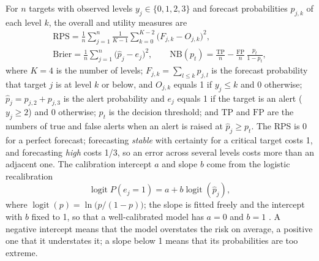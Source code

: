 For $n$ targets with observed levels $y_j \in \{0, 1, 2, 3\}$ and forecast probabilities $p_{j,k}$ of each level $k$, the overall and utility measures are
\begin{equation}
\begin{gathered}
  \mathrm{RPS} = \frac{1}{n}\sum_{j=1}^{n} \frac{1}{K-1}\sum_{k=0}^{K-2}\bigl(F_{j,k} - O_{j,k}\bigr)^2, \\
  \mathrm{Brier} = \frac{1}{n}\sum_{j=1}^{n}\bigl(\hat p_j - e_j\bigr)^2, \qquad
  \mathrm{NB}(p_t) = \frac{\mathrm{TP}}{n} - \frac{\mathrm{FP}}{n}\,\frac{p_t}{1-p_t},
\end{gathered}
\end{equation}
where $K = 4$ is the number of levels; $F_{j,k} = \sum_{l \leq k} p_{j,l}$ is the forecast probability that target $j$ is at level $k$ or below, and $O_{j,k}$ equals 1 if $y_j \leq k$ and 0 otherwise; $\hat p_j = p_{j,2} + p_{j,3}$ is the alert probability and $e_j$ equals 1 if the target is an alert ($y_j \geq 2$) and 0 otherwise; $p_t$ is the decision threshold; and $\mathrm{TP}$ and $\mathrm{FP}$ are the numbers of true and false alerts when an alert is raised at $\hat p_j \geq p_t$. The RPS is 0 for a perfect forecast; forecasting \emph{stable} with certainty for a critical target costs 1, and forecasting \emph{high} costs 1/3, so an error across several levels costs more than an adjacent one. The calibration intercept $a$ and slope $b$ come from the logistic recalibration
\begin{equation}
  \operatorname{logit} P(e_j = 1) = a + b \operatorname{logit}(\hat p_j),
\end{equation}
where $\operatorname{logit}(p) = \ln\bigl(p/(1-p)\bigr)$; the slope is fitted freely and the intercept with $b$ fixed to 1, so that a well-calibrated model has $a = 0$ and $b = 1$ \parencite{vancalster2019}. A negative intercept means that the model overstates the risk on average, a positive one that it understates it; a slope below 1 means that its probabilities are too extreme.

